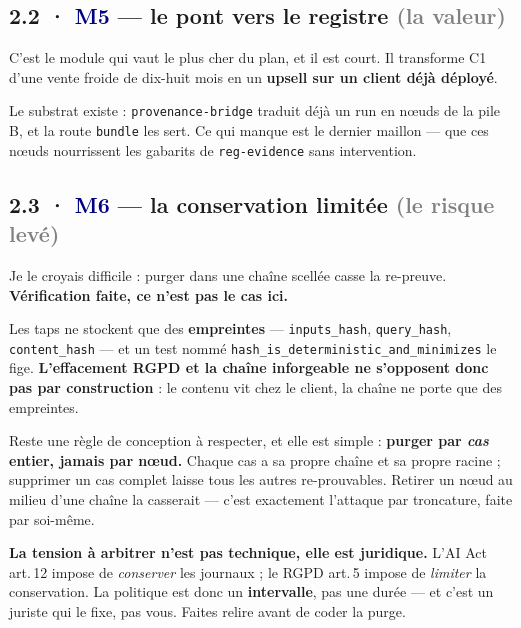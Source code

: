 \documentclass[10pt]{article}
\newcommand{\sz}[1]{\textcolor{grey}{\small\textsf{#1}}}
\newcommand{\code}[1]{\texttt{\small #1}}
\newcommand{\mm}[1]{\textbf{\textcolor{navy}{#1}}}
\begin{document}
\subsection{2.2 · \mm{M5} --- le pont vers le registre \sz{(la valeur)}}

C'est le module qui vaut le plus cher du plan, et il est court. Il transforme C1 d'une vente froide
de dix-huit mois en un \textbf{upsell sur un client déjà déployé}.

Le substrat existe : \code{provenance-bridge} traduit déjà un run en nœuds de la pile B, et la route
\code{bundle} les sert. Ce qui manque est le dernier maillon --- que ces nœuds nourrissent les
gabarits de \code{reg-evidence} sans intervention.

\subsection{2.3 · \mm{M6} --- la conservation limitée \sz{(le risque levé)}}

Je le croyais difficile : purger dans une chaîne scellée casse la re-preuve. \textbf{Vérification
faite, ce n'est pas le cas ici.}

\begin{acquis}
Les taps ne stockent que des \textbf{empreintes} --- \code{inputs\_hash}, \code{query\_hash},
\code{content\_hash} --- et un test nommé \code{hash\_is\_deterministic\_and\_minimizes} le fige.
\textbf{L'effacement RGPD et la chaîne inforgeable ne s'opposent donc pas par construction} : le
contenu vit chez le client, la chaîne ne porte que des empreintes.
\end{acquis}

Reste une règle de conception à respecter, et elle est simple : \textbf{purger par \emph{cas} entier,
jamais par nœud.} Chaque cas a sa propre chaîne et sa propre racine ; supprimer un cas complet laisse
tous les autres re-prouvables. Retirer un nœud au milieu d'une chaîne la casserait --- c'est
exactement l'attaque par troncature, faite par soi-même.

\begin{alerte}
\textbf{La tension à arbitrer n'est pas technique, elle est juridique.} L'AI Act art.\,12 impose de
\emph{conserver} les journaux ; le RGPD art.\,5 impose de \emph{limiter} la conservation. La politique
est donc un \textbf{intervalle}, pas une durée --- et c'est un juriste qui le fixe, pas vous. Faites
relire avant de coder la purge.
\end{alerte}
\end{document}
